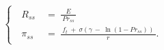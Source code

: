\begin{equation}
    \begin{cases}
        \begin{split}
        \ R_{ss} \
        & = \ \frac{E}{ \ Pr_{ss} \ } \\
        \ \pi_{ss} \
        & = \ \frac{ \ f_{t} \ + \ \sigma \left( \gamma \ - \ \ln(1 - Pr_{ss}) \right) \ }{r}.
        \end{split}
    \end{cases}
\label{Equation:Social-Planners-Problem_System-of-Equations-for-Steady-State}
\end{equation}